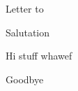 \documentclass{letter}
\begin{document}
\begin{letter}{Letter to}
\opening{Salutation}

Hi stuff whawef

\closing{Goodbye}
\end{letter}
\end{document}
